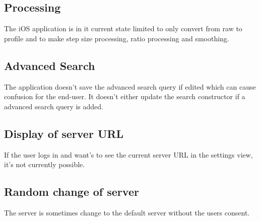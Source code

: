 


\subsection{Processing}
The iOS application is in it current state limited to only convert from raw to profile and to make step size processing, ratio processing and smoothing. 

\subsection{Advanced Search}
The application doesn't save the advanced search query if edited which can cause confusion for the end-user. It doesn't either update the search constructor if a advanced search query is added.  

\subsection{Display of server URL}
If the user logs in and want's to see the current server URL in the settings view, it's not currently possible.

\subsection{Random change of server}
The server is sometimes change to the default server without the users consent. 
